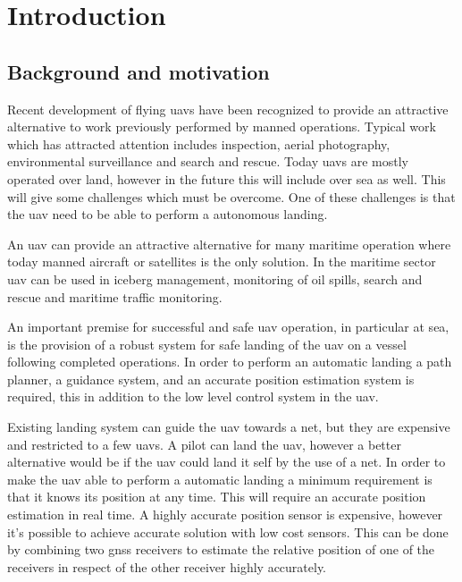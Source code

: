 
\chapter{Introduction}

\section{Background and motivation}
Recent development of flying \glspl{uav} have been recognized to provide an attractive alternative to work previously performed by manned operations. Typical work which has attracted attention includes inspection, aerial photography, environmental surveillance and search and rescue. Today \glspl{uav} are mostly operated over land, however in the future this will include over sea as well. This will give some challenges which must be overcome. One of these challenges is that the \gls{uav} need to be able to perform a autonomous landing.

An \gls{uav} can provide an attractive alternative for many maritime operation where today manned aircraft or satellites is the only solution. In the maritime sector \gls{uav} can be used in iceberg management, monitoring of oil spills, search and rescue and maritime traffic monitoring.

An important premise for successful and safe \gls{uav} operation, in particular at sea, is the provision of a robust system for safe landing of the \gls{uav} on a vessel following completed operations. In order to perform an automatic landing a path planner, a guidance system, and an accurate position estimation system is required, this in addition to the low level control system in the \gls{uav}.

Existing landing system can guide the \gls{uav} towards a net, but they are expensive and restricted to a few \glspl{uav}. A pilot can land the \gls{uav}, however a better alternative would be if the \gls{uav} could land it self by the use of a net. In order to make the \gls{uav} able to perform a automatic landing a minimum requirement is that it knows its position at any time. This will require an accurate position estimation in real time. A highly accurate position sensor is expensive, however it's possible to achieve accurate solution with low cost sensors. This can be done by combining two \gls{gnss} receivers to estimate the relative position of one of the receivers in respect of the other receiver highly accurately.

